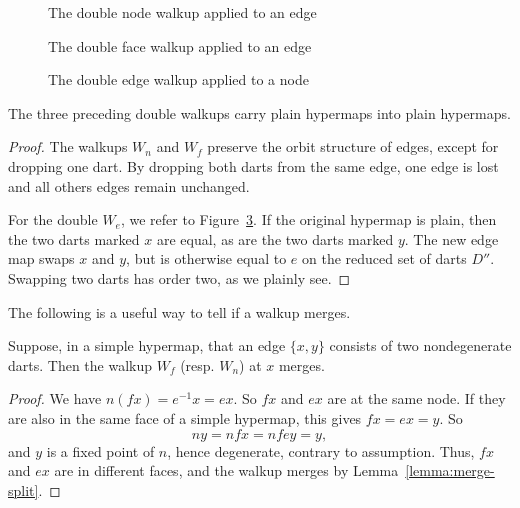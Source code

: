 \begin{figure}[htb]
  \centering
  \caption{The double node walkup applied to an edge}
  \label{fig:doublenode}
\end{figure}


\begin{figure}[htb]
  \centering
  \caption{The double face walkup applied to an edge}
  \label{fig:doubleface}
\end{figure}


\begin{figure}[htb]
  \centering
  \caption{The double edge walkup applied to a node}
  \label{fig:doubleedge}
\end{figure}


\begin{lemma}  
The three preceding double walkups carry plain
hypermaps into plain hypermaps.
\end{lemma}

\begin{proof} The walkups $W_n$ and $W_f$ preserve the orbit
structure of edges, except for dropping one dart.  By dropping both
darts from the same edge, one edge is lost and all others edges
remain unchanged.

For the double $W_e$, we refer to Figure~\ref{fig:doubleedge}.  
If the
original hypermap is plain, then the two darts marked 
$x$ are equal, as are
the two darts marked $y$.  
The new edge map swaps $x$ and $y$, but is 
otherwise equal to $e$ on 
the reduced set of darts $D''$.  
Swapping two darts has order two, 
as we plainly see.
\end{proof}

The following is a useful way to tell if a walkup merges.


\begin{lemma}  
Suppose, in a simple hypermap, 
that an edge $\{x,y\}$ consists of two nondegenerate darts.  
Then the walkup
 $W_f$ (resp. $W_n$) at $x$  merges.
\end{lemma}

\begin{proof} 
We have $n (f x) = e^{-1} x = e x$. So $f x$ and $e x$ are at the
same node. If they are also in the same face of a simple hypermap, 
this gives $f x = e x
= y$. So $$n y  = n f x = n f e y = y,$$ and $y$ is a fixed
point of $n$, hence degenerate, contrary to assumption.  
Thus, $f x$
and $e x$ are in different faces, and the walkup merges
by Lemma~\ref{lemma:merge-split}.  
\end{proof}




